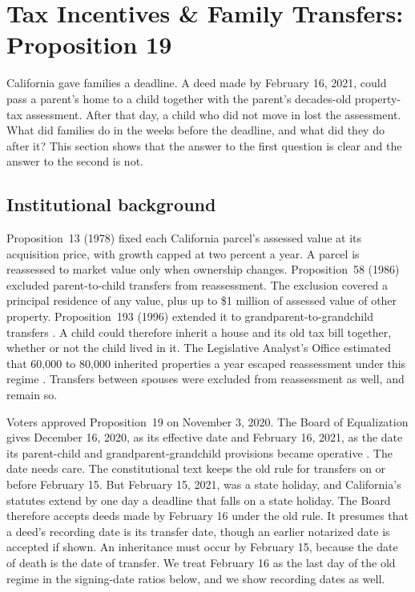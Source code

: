 \section{Tax Incentives \& Family Transfers: Proposition 19}\label{sec:prop19}

California gave families a deadline. A deed made by February 16, 2021, could pass a parent's home to a child together with the parent's decades-old property-tax assessment. After that day, a child who did not move in lost the assessment. What did families do in the weeks before the deadline, and what did they do after it? This section shows that the answer to the first question is clear and the answer to the second is not.

\subsection{Institutional background}\label{subsec:institutions}

Proposition~13 (1978) fixed each California parcel's assessed value at its acquisition price, with growth capped at two percent a year. A parcel is reassessed to market value only when ownership changes. Proposition~58 (1986) excluded parent-to-child transfers from reassessment. The exclusion covered a principal residence of any value, plus up to \$1 million of assessed value of other property. Proposition~193 (1996) extended it to grandparent-to-grandchild transfers \citep{boe2025prop19}. A child could therefore inherit a house and its old tax bill together, whether or not the child lived in it. The Legislative Analyst's Office estimated that 60,000 to 80,000 inherited properties a year escaped reassessment under this regime \citep{lao2017inheritance}. Transfers between spouses were excluded from reassessment as well, and remain so.

Voters approved Proposition~19 on November 3, 2020. The Board of Equalization gives December 16, 2020, as its effective date and February 16, 2021, as the date its parent-child and grandparent-grandchild provisions became operative \citep{boe2025prop19}. The date needs care. The constitutional text keeps the old rule for transfers on or before February 15. But February 15, 2021, was a state holiday, and California's statutes extend by one day a deadline that falls on a state holiday. The Board therefore accepts deeds made by February 16 under the old rule. It presumes that a deed's recording date is its transfer date, though an earlier notarized date is accepted if shown. An inheritance must occur by February 15, because the date of death is the date of transfer. We treat February 16 as the last day of the old regime in the signing-date ratios below, and we show recording dates as well.

